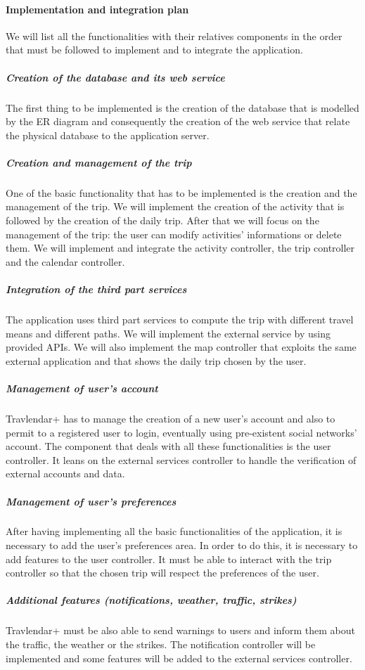 \documentclass[12pt,titlepage]{article}
\begin{document}
\paragraph{Implementation and integration plan}
We will list all the functionalities with their relatives components in the order that must be followed to implement and to integrate the application.
\subparagraph{Creation of the database and its web service}
The first thing to be implemented is the creation of the database that is modelled by the ER diagram and consequently the creation of the web service that relate the physical database to the application server.
\subparagraph{Creation and management of the trip}
One of the basic functionality that has to be implemented is the creation and the management of the trip. We will implement the creation of the activity that is followed by the creation of the daily trip. After that we will focus on the management of the trip: the user can modify activities' informations or delete them.
We will implement and integrate the activity controller, the trip controller and the calendar controller.

\subparagraph{Integration of the third part services}
The application uses third part services to compute the trip with different travel means and different paths. We will implement the external service by using provided APIs. We will also implement the map controller that exploits the same external application and that shows the daily trip chosen by the user.
\subparagraph{Management of user's account}
Travlendar+ has to manage the creation of a new user's account and also to permit to a registered user to login, eventually using pre-existent social networks' account. The component that deals with all these functionalities is the user controller. It leans on the external services controller to handle the verification of external accounts and data.
 
\subparagraph{Management of user's preferences}
After having implementing all the basic functionalities of the application, it is necessary to add the user's preferences area. In order to do this, it is necessary to add features to the user controller. It must be able to interact with the trip controller so that the chosen trip will respect the preferences of the user.

\subparagraph{Additional features (notifications, weather, traffic, strikes)}
Travlendar+ must be also able to send warnings to users and inform them about the traffic, the weather or the strikes. The notification controller will be implemented and some features will be added to the external services controller.
\end{document}
